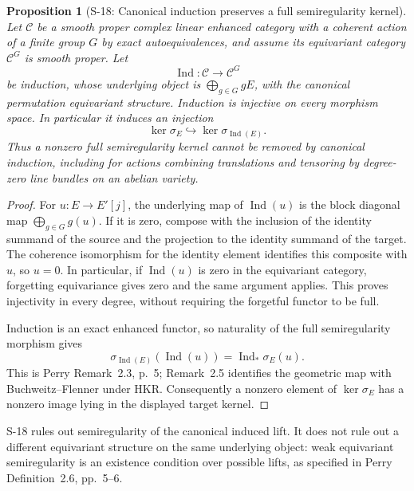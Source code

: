 \documentclass[11pt,a4paper]{article}
\newtheorem{proposition}[theorem]{Proposition}
\theoremstyle{definition}
\begin{document}
\begin{proposition}[S-18: Canonical induction preserves a full semiregularity kernel]
\label{prop:semireg-induction-kernel}
Let $\mathcal C$ be a smooth proper complex linear enhanced
category with a coherent action of a finite group $G$ by exact
autoequivalences, and assume its equivariant category
$\mathcal C^G$ is smooth proper. Let
\[
 \operatorname{Ind}:\mathcal C\longrightarrow\mathcal C^G
\]
be induction, whose underlying object is
$\bigoplus_{g\in G}gE$, with the canonical permutation
equivariant structure. Induction is injective on every morphism
space. In particular it induces an injection
\[
 \ker\sigma_E\hookrightarrow
       \ker\sigma_{\operatorname{Ind}(E)}.
\]
Thus a nonzero full semiregularity kernel cannot be removed by
canonical induction, including for actions combining
translations and tensoring by degree-zero line bundles on an
abelian variety.
\end{proposition}
\begin{proof}
For $u:E\to E'[j]$, the underlying map of
$\operatorname{Ind}(u)$ is the block diagonal map
$\bigoplus_{g\in G}g(u)$.
If it is zero, compose with the inclusion of the identity
summand of the source and the projection to the identity
summand of the target. The coherence isomorphism for the
identity element identifies this composite with $u$, so $u=0$.
In particular, if $\operatorname{Ind}(u)$ is zero in the
equivariant category, forgetting equivariance gives zero and
the same argument applies. This proves injectivity in every
degree, without requiring the forgetful functor to be full.

Induction is an exact enhanced functor, so naturality of the
full semiregularity morphism gives
\[
 \sigma_{\operatorname{Ind}(E)}(\operatorname{Ind}(u))
       =\operatorname{Ind}_*\sigma_E(u).
\]
This is Perry Remark~2.3, p.~5; Remark~2.5 identifies the
geometric map with Buchweitz--Flenner under HKR.
Consequently a nonzero element of $\ker\sigma_E$ has a
nonzero image lying in the displayed target kernel.
\end{proof}

S-18 rules out semiregularity of the canonical induced lift.
It does not rule out a different equivariant structure on the
same underlying object: weak equivariant semiregularity is
an existence condition over possible lifts, as specified in
Perry Definition~2.6, pp.~5--6.
\end{document}
